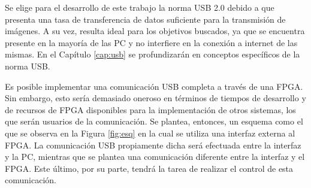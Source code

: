 
Se elige para el desarrollo de este trabajo la norma USB 2.0 debido a que presenta una tasa de transferencia de datos suficiente para la transmisión de imágenes. A su vez, resulta ideal para los objetivos buscados, ya que se encuentra presente en la mayoría de las PC y no interfiere en la conexión a internet de las mismas. En el Capítulo \ref{cap:usb} se profundizarán en conceptos específicos de la norma USB.%

Es posible implementar una comunicación USB completa a través de una FPGA. Sin embargo, esto sería demasiado oneroso en términos de tiempos de desarrollo y de recursos de FPGA disponibles para la implementación de otros sistemas, los que serán usuarios de la comunicación. Se plantea, entonces, un esquema como el que se observa en la Figura \ref{fig:esq} en la cual se utiliza una interfaz externa al FPGA. La comunicación USB propiamente dicha será efectuada entre la interfaz y la PC, mientras que se plantea una comunicación diferente entre la interfaz y el FPGA. Este último, por su parte, tendrá la tarea de realizar el control de esta comunicación.


